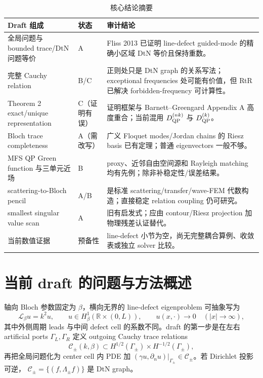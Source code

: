 \documentclass[UTF8,11pt,fontset=none]{ctexart}
\begin{document}
\begin{table}[htbp]
\centering
\caption{核心结论摘要}
\small
\begin{tabularx}{\textwidth}{p{} C{2.0cm} Y}
\toprule
Draft 组成 & 状态 & 审计结论 \\
\midrule
全局问题与 bounded trace/DtN 问题等价 & A & Fliss 2013 已证明 line-defect guided-mode 的精确小区域 DtN 等价且保持重数。 \\
完整 Cauchy relation & B/C & 正则处只是 DtN graph 的关系写法；exceptional frequencies 处可能有价值，但 RtR 已解决 forbidden-frequency 可计算性。 \\
Theorem 2 exact/unique representation & C（证明有误） & 证明框架与 Barnett--Greengard Appendix A 高度重合；当前混用 \(D^{(nk)}_{\rm QP}\) 与 \(D^{(k)}_{\rm QP}\)。 \\
Bloch trace completeness & A（需改写） & 广义 Floquet modes/Jordan chains 的 Riesz basis 已有定理；普通 eigenvectors 一般不够。 \\
MFS QP Green function 与三单元近场 & B & proxy、近邻自由空间源和 Rayleigh matching 均有先例；除非补稳定性/误差结果。 \\
scattering-to-Bloch pencil & A/B & 是标准 scattering/transfer/wave-FEM 代数构造；直接稳定 relation coupling 仍可研究。 \\
smallest singular value scan & A & 旧有启发式；应由 contour/Riesz projection 加物理残差认证替代。 \\
当前数值证据 & 预备性 & line-defect 小节为空，尚无完整耦合算例、收敛表或独立 solver 比较。 \\
\bottomrule
\end{tabularx}
\end{table}

\section{当前 draft 的问题与方法概述}

轴向 Bloch 参数固定为 \(\beta\)，横向无界的 line-defect eigenproblem 可抽象写为
\begin{equation}
  \mathcal L_\beta u = k^2 u,\qquad
  u\in H^1_{\beta}(\mathbb R\times(0,L)),\qquad
  u(x,\cdot)\to0\quad (|x|\to\infty),
\end{equation}
其中外侧周期 leads 与中间 defect cell 的系数不同。draft 的第一步是在左右 artificial
ports \(\Gamma_L,\Gamma_R\) 定义 outgoing Cauchy trace relations
\begin{equation}
  \mathcal C_\pm(k,\beta)
  \subset H^{1/2}(\Gamma_\pm)\times H^{-1/2}(\Gamma_\pm),
\end{equation}
再把全局问题化为 center cell 内 PDE 加
\((\gamma u,\partial_n u)|_{\Gamma_\pm}\in\mathcal C_\pm\)。若 Dirichlet 投影可逆，
\(\mathcal C_\pm=\{(f,\Lambda_\pm f)\}\) 是 DtN graph。
\end{document}
